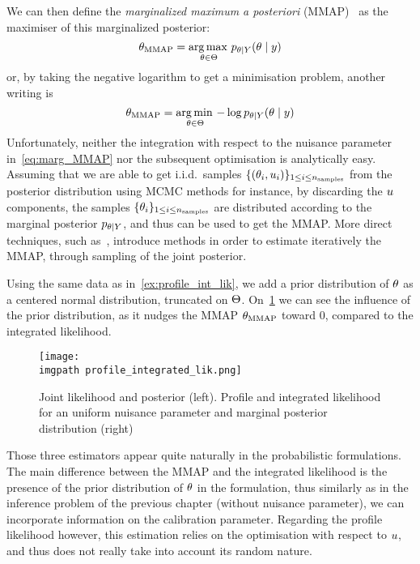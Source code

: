 \documentclass[../../Main_ManuscritThese.tex]{subfiles}
\newcommand\imgpath{/home/victor/acadwriting/Manuscrit/Text/Chapter3/img/}
\begin{document}
We can then define the \emph{marginalized maximum a posteriori}
(MMAP)~\citep{doucet_marginal_2002} as the maximiser of this
marginalized posterior:
\begin{equation}
  \label{eq:def_MMAP}
  {\theta}_{\mathrm{MMAP}} = \operatorname*{arg\,max \,}_{\theta\in\Theta} p_{\theta \mid Y}(\theta\mid y)
\end{equation}
or, by taking the negative logarithm to get a minimisation problem,
another writing is
\begin{equation}
{\theta}_{\mathrm{MMAP}} = \operatorname*{arg\,min \,}_{\theta\in\Theta} -\log  p_{\theta\mid Y}(\theta\mid y)
\end{equation}
Unfortunately, neither the integration with respect to the nuisance
parameter in~\eqref{eq:marg_MMAP} nor the subsequent optimisation is
analytically easy.  Assuming that we are able to get i.i.d.\ samples
$\{(\theta_i, u_i)\}_{1\leq i \leq n_{\mathrm{samples}}}$ from the
posterior distribution using MCMC methods for instance, by discarding
the $u$ components, the samples
$\{\theta_i\}_{1 \leq i\leq n_{\mathrm{samples}}}$ are distributed
according to the marginal posterior $p_{\theta \mid Y}$, and thus can be
used to get the MMAP. More direct techniques, such
as~\cite{doucet_marginal_2002}, introduce methods in order to estimate
iteratively the MMAP, through sampling of the joint posterior.
\begin{example}
  Using the same data as in~\cref{ex:profile_int_lik}, we add a prior
  distribution of $\theta$ as a centered normal distribution, truncated
  on $\Theta$. On~\cref{fig:profile_integrated_lik} we can see the
  influence of the prior distribution, as it nudges the MMAP
  ${\theta}_{\mathrm{MMAP}}$ toward $0$, compared to the integrated
  likelihood.
\end{example}
\begin{figure}[ht]
  \centering
  \texttt{[image: \\imgpath profile\_integrated\_lik.png]}
  \caption[Joint likelihood and posterior
  distribution]{\label{fig:profile_integrated_lik} Joint likelihood
    and posterior (left). Profile and integrated likelihood for an
    uniform nuisance parameter and marginal posterior distribution
    (right)}
\end{figure}
Those three estimators appear quite naturally in the probabilistic
formulations. The main difference between the MMAP and the integrated
likelihood is the presence of the prior distribution of $\theta$ in the
formulation, thus similarly as in the inference problem of the
previous chapter (without nuisance parameter), we can incorporate
information on the calibration parameter. Regarding the profile
likelihood however, this estimation relies on the optimisation with
respect to $u$, and thus does not really take into account its
random nature.
\end{document}
